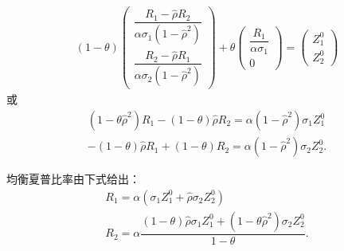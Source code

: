 \documentclass[10.0pt]{article}
\begin{document}
\begin{eqnarray}
(1 - \theta) \left( \begin{matrix} \dfrac{R_1 - \hat \rho R_2}{\alpha \sigma_1 (1 - \hat \rho^2)} \\ \dfrac{R_2 - \hat \rho R_1}{\alpha \sigma_2 (1 - \hat \rho^2)} \end{matrix} \right) + \theta \left( \begin{matrix} \dfrac{R_1}{\alpha \sigma_1} \\ 0 \end{matrix} \right) = \left( \begin{matrix} Z_1^0 \\ Z_2^0 \end{matrix} \right)
\end{eqnarray}
或
\begin{eqnarray*}
& (1 - \theta {\hat \rho}^2) R_1 - (1 - \theta) {\hat \rho} R_2 = \alpha (1 - {\hat \rho}^2) \sigma_1 Z_1^0 & \\
& - (1 - \theta) {\hat \rho} R_1 + (1 - \theta) R_2 = \alpha (1 - {\hat \rho}^2) \sigma_2 Z_2^0. &
\end{eqnarray*}

均衡夏普比率由下式给出：
\begin{eqnarray}
& R_1 = \alpha (\sigma_1 Z_1^0 + {\hat \rho} \sigma_2 Z_2^0) & \\
& R_2 = \alpha \dfrac{(1 - \theta) {\hat \rho} \sigma_1 Z_1^0 + (1 - \theta {\hat \rho}^2) \sigma_2 Z_2^0}{1 - \theta}. &
\end{eqnarray}
\end{document}
